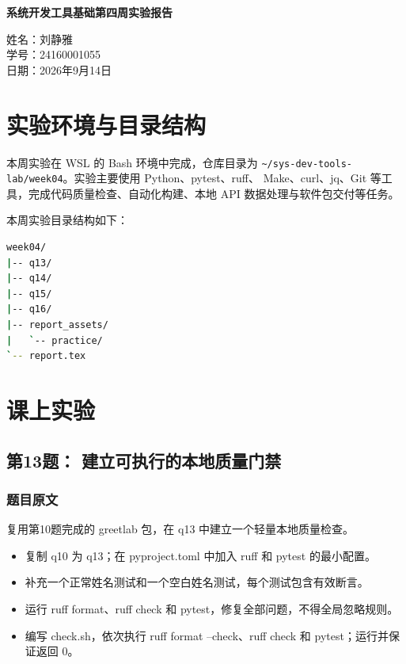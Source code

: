 \documentclass[12pt,a4paper]{ctexart}
\begin{document}
\begin{titlepage}
\thispagestyle{empty}
\begin{center}
\vspace*{3.2cm}

{\bfseries 系统开发工具基础第四周实验报告}

\vfill

{
姓名：刘静雅\\[0.8cm]
学号：24160001055\\[0.8cm]
日期：2026年9月14日
}

\vspace*{4.2cm}
\end{center}
\end{titlepage}

\clearpage
\thispagestyle{plain}
\tableofcontents
\clearpage

\section{实验环境与目录结构}

本周实验在 WSL 的 Bash 环境中完成，仓库目录为
\verb|~/sys-dev-tools-lab/week04|。实验主要使用 Python、pytest、ruff、
Make、curl、jq、Git 等工具，完成代码质量检查、自动化构建、本地 API
数据处理与软件包交付等任务。

本周实验目录结构如下：

\begin{lstlisting}[language=bash]
week04/
|-- q13/
|-- q14/
|-- q15/
|-- q16/
|-- report_assets/
|   `-- practice/
`-- report.tex
\end{lstlisting}

\section{课上实验}

\subsection{第13题： 建立可执行的本地质量门禁}

\subsubsection*{题目原文}

复用第10题完成的 greetlab 包，在 q13 中建立一个轻量本地质量检查。

\begin{itemize}
  \item 复制 q10 为 q13；在 pyproject.toml 中加入 ruff 和 pytest 的最小配置。
  \item 补充一个正常姓名测试和一个空白姓名测试，每个测试包含有效断言。
  \item 运行 ruff format、ruff check 和 pytest，修复全部问题，不得全局忽略规则。
  \item 编写 check.sh，依次执行 ruff format --check、ruff check 和 pytest；运行并保证返回 0。
\end{itemize}
\end{document}
